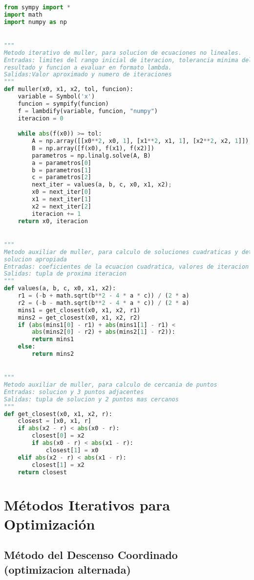 \documentclass[12pt]{article}
\begin{document}
\begin{lstlisting}[language=Python, caption=Implementación del método de Müller en Python] 
from sympy import *
import math
import numpy as np


"""
Metodo iterativo de muller, para solucion de ecuaciones no lineales.
Entradas: limites del rango inicial de iteracion, tolerancia minima del
resultado y funcion a evaluar en formato lambda.
Salidas:Valor aproximado y numero de iteraciones
"""
def muller(x0, x1, x2, tol, funcion):
    variable = Symbol('x')
    funcion = sympify(funcion)
    f = lambdify(variable, funcion, "numpy")
    iteracion = 0

    while abs(f(x0)) >= tol:
        A = np.array([[x0**2, x0, 1], [x1**2, x1, 1], [x2**2, x2, 1]])
        B = np.array([f(x0), f(x1), f(x2)])
        parametros = np.linalg.solve(A, B)
        a = parametros[0]
        b = parametros[1]
        c = parametros[2]
        next_iter = values(a, b, c, x0, x1, x2);
        x0 = next_iter[0]
        x1 = next_iter[1]
        x2 = next_iter[2]
        iteracion += 1
    return x0, iteracion


"""
Metodo auxiliar de muller, para calculo de soluciones cuadraticas y determinar
solucion apropiada
Entradas: coeficientes de la ecuacion cuadratica, valores de iteracion
Salidas: tupla de proxima iteracion
"""
def values(a, b, c, x0, x1, x2):
    r1 = (-b + math.sqrt(b**2 - 4 * a * c)) / (2 * a)
    r2 = (-b - math.sqrt(b**2 - 4 * a * c)) / (2 * a)
    mins1 = get_closest(x0, x1, x2, r1)
    mins2 = get_closest(x0, x1, x2, r2)
    if (abs(mins1[0] - r1) + abs(mins1[1] - r1) <
        abs(mins2[0] - r2) + abs(mins2[1] - r2)):
        return mins1
    else:
        return mins2


"""
Metodo auxiliar de muller, para calculo de cercania de puntos
Entradas: solucion y 3 puntos adjacentes
Salidas: tupla de solucion y 2 puntos mas cercanos
"""
def get_closest(x0, x1, x2, r):
    closest = [x0, x1, r]
    if abs(x2 - r) < abs(x0 - r):
        closest[0] = x2
        if abs(x0 - r) < abs(x1 - r):
            closest[1] = x0
    elif abs(x2 - r) < abs(x1 - r):
        closest[1] = x2
    return closest

\end{lstlisting}

\section{Métodos Iterativos para Optimización}
\subsection{Método del Descenso Coordinado (optimizacion alternada)}
\end{document}
